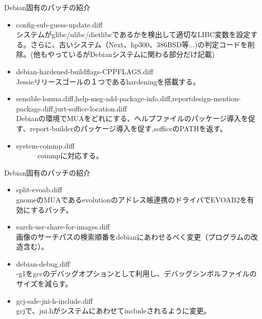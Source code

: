 \begin{frame}{Debian固有のパッチの紹介}

 \begin{itemize}
  \item config-sub-guess-update.diff \\
    システムがglibc/ulibc/dietlibcであるかを検出して適切なLIBC変数を設定する。さらに、古いシステム（Next、hp300、386BSD等...)の判定コードを削除。(他もやっているがDebianシステムに関わる部分だけ記載)
  \item debian-hardened-buildflags-CPPFLAGS.diff \\ 
    Jessieリリースゴールの１つであるhardeningを搭載する。
  \item sensible-lomua.diff,help-msg-add-package-info.diff,reportdesign-mention-package.diff,jurt-soffice-location.diff \\
    Debianの環境でMUAをどれにする、ヘルプファイルのパッケージ導入を促す、report-builderのパッケージ導入を促す,sofficeのPATHを返す。
　 \item system-coinmp.diff \\
　　　coinmpに対応する。
 \end{itemize}

\end{frame}

\begin{frame}{Debian固有のパッチの紹介}

 \begin{itemize}
  \item split-evoab.diff \\
    gnomeのMUAであるevolutionのアドレス帳連携のドライバでEVOAB2を有効にするパッチ。
  \item earch-usr-share-for-images.diff \\
    画像のサーチパスの検索順番をdebianにあわせるべく変更（プログラムの改造含む）。
  \item debian-debug.diff \\
    -g1をgccのデバッグオプションとして利用し、デバッグシンボルファイルのサイズを減らす。
  \item gcj-safe-jni-h-include.diff \\
    gcjで、jni.hがシステムにあわせてincludeされるように変更。
 \end{itemize}

\end{frame}

